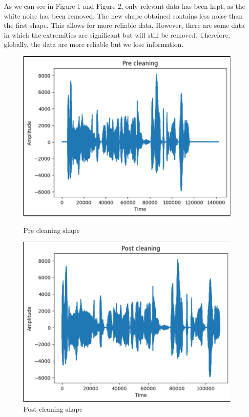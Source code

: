 \documentclass[twocolumn]{article}
\begin{document}
As we can see in Figure 1 and Figure 2, only relevant data has been kept, as the white noise has been removed. The new shape obtained contains less noise than the first shape. This allows for more reliable data. However, there are some data in which the extremities are significant but will still be removed. Therefore, globally, the data are more reliable but we lose information.\\
\begin{figure}[!tbp]
  \centering
  \begin{minipage}[b]{0.4\textwidth}
    \includegraphics[width=\textwidth]{images/pre_cleaning.png}
    \caption{Pre cleaning shape}
  \end{minipage}
  \hfill
  \begin{minipage}[b]{0.4\textwidth}
    \includegraphics[width=\textwidth]{images/post_cleaning.png}
    \caption{Post cleaning shape}
  \end{minipage}
\end{figure}
\end{document}

